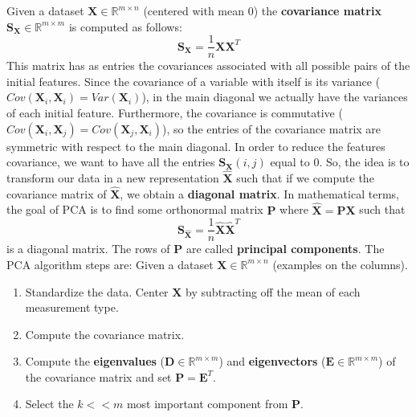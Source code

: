 Given a dataset $\textbf{X} \in \mathbb{R}^{m \times n}$ (centered with mean 0) the \textbf{covariance matrix} $\textbf{S}_{\textbf{X}} \in \mathbb{R}^{m \times m}$ is computed as follows:
\[\textbf{S}_{\textbf{X}} = \frac{1}{n}\textbf{X}\textbf{X}^{T}\]
This matrix has as entries the covariances associated with all possible pairs of the initial features. Since the covariance of a variable with itself is its variance ($Cov(\textbf{X}_{i},\textbf{X}_{i})=Var(\textbf{X}_{i})$), in the main diagonal we actually have the variances of each initial feature. Furthermore, the covariance is commutative ($Cov(\textbf{X}_{i},\textbf{X}_{j})=Cov(\textbf{X}_{j},\textbf{X}_{i})$), so the entries of the covariance matrix are symmetric with respect to the main diagonal.\newline\newline
In order to reduce the features covariance, we want to have all the entries $\textbf{S}_{\textbf{X}}(i, j)$ equal to 0. So, the idea is to transform our data in a new representation $\hat{\textbf{X}}$ such that if we compute the covariance matrix of $\hat{\textbf{X}}$, we obtain a \textbf{diagonal matrix}.\newline\newline
In mathematical terms, the goal of PCA is to find some orthonormal matrix $\textbf{P}$ where $\hat{\textbf{X}} = \textbf{PX}$ such that
\[\textbf{S}_{\hat{\textbf{X}}} = \frac{1}{n}\hat{\textbf{X}}\hat{\textbf{X}}^{T}\]
is a diagonal matrix. \newline
The rows of $\textbf{P}$ are called \textbf{principal components}.\newline\newline
The PCA algorithm steps are:\newline
Given a dataset $\textbf{X} \in \mathbb{R}^{m \times n}$ (examples on the columns).
\begin{enumerate}
    \item Standardize the data. Center $\textbf{X}$ by subtracting off the mean of each measurement type.

    \item Compute the covariance matrix.

    \item Compute the \textbf{eigenvalues} ($\textbf{D} \in \mathbb{R}^{m \times m}$) and \textbf{eigenvectors} ($\textbf{E} \in \mathbb{R}^{m \times m}$) of the covariance matrix and set $\textbf{P} = \textbf{E}^{T}$.

    \item Select the $k << m$ most important component from $\textbf{P}$.
\end{enumerate}
